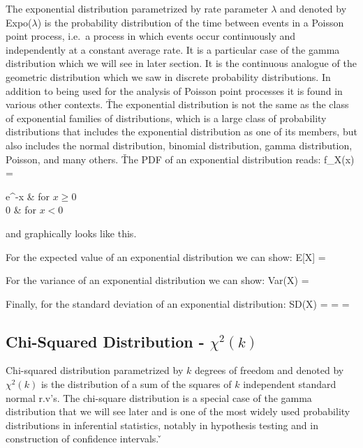 The exponential distribution parametrized by rate parameter $\lambda$ and denoted by Expo($\lambda$) is the
probability distribution of the time between events in a Poisson point process, i.e.\ a process in which events occur
continuously and independently at a constant average rate. It is a particular case of the gamma distribution which we
will see in later section. It is the continuous analogue of the geometric distribution which we saw in discrete
probability distributions. In addition to being used for the analysis of Poisson point processes it is found in
various other contexts. \v

The exponential distribution is not the same as the class of exponential families of distributions, which is a large
class of probability distributions that includes the exponential distribution as one of its members, but also
includes the normal distribution, binomial distribution, gamma distribution, Poisson, and many others. \v

The PDF of an exponential distribution reads:
\bse
f_{X}(x) = \begin{cases*} \lambda e^{-\lambda x} & for $x \geq 0$ \\ 0 & for $x < 0$ \end{cases*}
\ese
\ed

and graphically looks like this.

\vspace{-5pt}


For the expected value of an exponential distribution we can show:
\bse
E[X] = 
\ese

For the variance of an exponential distribution we can show:
\bse
Var(X) = 
\ese

Finally, for the standard deviation of an exponential distribution:
\bse
SD(X) =  =  = 
\ese

\subsection{Chi-Squared Distribution - $\chi^2(k)$}

Chi-squared distribution parametrized by $k$ degrees of freedom and denoted by $\chi^2(k)$ is the distribution of a
sum of the squares of $k$ independent standard normal r.v's. The chi-square distribution is a special case of the
gamma distribution that we will see later and is one of the most widely used probability distributions in inferential
statistics, notably in hypothesis testing and in construction of confidence intervals. \v

